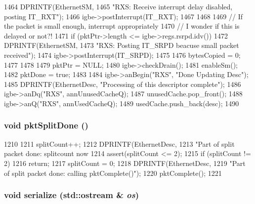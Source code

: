 \begin{DoxyCode}
{{{1464             DPRINTF(EthernetSM,
1465                     "RXS: Receive interrupt delay disabled, posting IT_RXT\n");
1466             igbe->postInterrupt(IT_RXT);
1467         }
1468 
1469         // If the packet is small enough, interrupt appropriately
1470         // I wonder if this is delayed or not?!
1471         if (pktPtr->length <= igbe->regs.rsrpd.idv()) {
1472             DPRINTF(EthernetSM,
1473                     "RXS: Posting IT_SRPD beacuse small packet received\n");
1474             igbe->postInterrupt(IT_SRPD);
1475         }
1476         bytesCopied = 0;
1477     }
1478 
1479     pktPtr = NULL;
1480     igbe->checkDrain();
1481     enableSm();
1482     pktDone = true;
1483 
1484     igbe->anBegin("RXS", "Done Updating Desc");
1485     DPRINTF(EthernetDesc, "Processing of this descriptor complete\n");
1486     igbe->anDq("RXS", annUnusedCacheQ);
1487     unusedCache.pop_front();
1488     igbe->anQ("RXS", annUsedCacheQ);
1489     usedCache.push_back(desc);
1490 }
\end{DoxyCode}
\hypertarget{classIGbE_1_1RxDescCache_a05f4f640320394e21432a2d1c2ce8edc}{
\subsubsection[{pktSplitDone}]{\setlength{\rightskip}{0pt plus 5cm}void pktSplitDone ()}}
\label{classIGbE_1_1RxDescCache_a05f4f640320394e21432a2d1c2ce8edc}



\begin{DoxyCode}
1210 {
1211     splitCount++;
1212     DPRINTF(EthernetDesc,
1213             "Part of split packet done: splitcount now %
1214     assert(splitCount <= 2);
1215     if (splitCount != 2)
1216         return;
1217     splitCount = 0;
1218     DPRINTF(EthernetDesc,
1219             "Part of split packet done: calling pktComplete()\n");
1220     pktComplete();
1221 }
\end{DoxyCode}
\hypertarget{classIGbE_1_1RxDescCache_a53e036786d17361be4c7320d39c99b84}{
\subsubsection[{serialize}]{\setlength{\rightskip}{0pt plus 5cm}void serialize (std::ostream \& {\em os})}}
\label{classIGbE_1_1RxDescCache_a53e036786d17361be4c7320d39c99b84}


